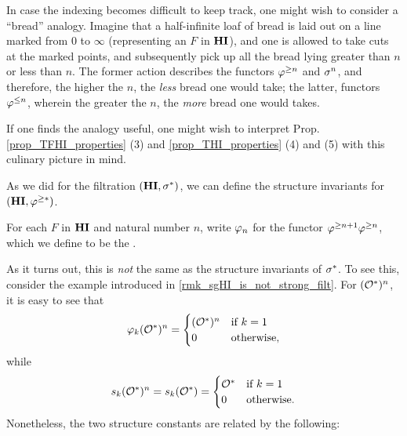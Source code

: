 \begin{rmk}
In case the indexing becomes difficult to keep track, one might
wish to consider a ``bread'' analogy. Imagine that a half-infinite 
loaf of bread is laid out on a line marked from 0 to $\infty$ 
(representing an $F$ in $\mathbf{HI}$), and one is allowed to take cuts at 
the marked points, and subsequently pick up all the bread lying 
greater than $n$ or less than $n$. The former action describes the 
functors $\varphi^{\geq n}$ and $\sigma^{n}$, and therefore, the higher the 
$n$, the \emph{less} bread one would take; the latter, functors 
$\varphi^{\leq n}$, wherein the greater the $n$, the \emph{more} bread one 
would takes.

If one finds the analogy useful, one might wish to interpret
Prop. \ref{prop_TFHI_properties} (3) and \ref{prop_THI_properties} (4)
and (5) with this culinary picture in mind.
\end{rmk}

As we did for the filtration $(\mathbf{HI}, \sigma^{*})$, we can define the 
structure invariants for $(\mathbf{HI}, \varphi^{\geq *})$. 
\begin{defn}
For each $F$ in $\mathbf{HI}$ and natural number $n$, write $\varphi_{n}$ 
for the functor $\varphi^{\geq n + 1} \varphi^{\geq n}$, which we define to be the 
. 
\end{defn}

As it turns out, this is \emph{not} the same as the structure 
invariants of $\sigma^{*}$. To see this, consider the example 
introduced in \ref{rmk_sgHI_is_not_strong_filt}. For $(\mathcal{O}^*)^n$,
it is easy to see that 
\[
\varphi_{k}(\mathcal{O}^*)^n = \begin{cases}
(\mathcal{O}^*)^n &\textrm{if }k = 1\\
0     &\textrm{otherwise},
\end{cases}
\]
while
\[
s_k(\mathcal{O}^*)^n = s_k(\mathcal{O}^*) = \begin{cases}
\mathcal{O}^* &\textrm{if }k = 1\\
0   &\textrm{otherwise}.
\end{cases}
\]
Nonetheless, the two structure constants are related by the 
following:

